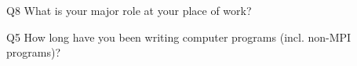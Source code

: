 \begin{description}%
\item{Q8} What is your major role at your place of work?%
\item{Q5} How long have you been writing computer programs (incl. non-MPI programs)?%
\end{description}%
